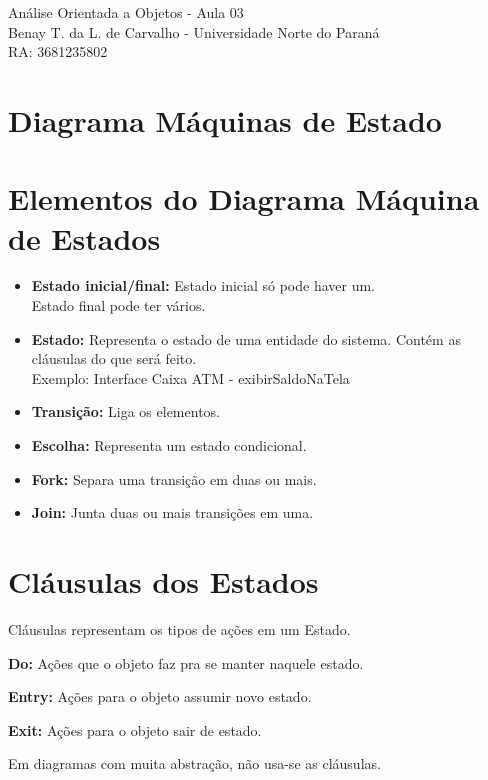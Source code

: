 \documentclass[12pt, a4paper]{article}
\newcommand{\cvsection}[1]{\section*{\rmfamily#1}}
\begin{document}
\selectfont

\begin{center}

    {\LARGE
        Análise Orientada a Objetos - Aula 03\\
    }
    {\Large
        Benay T. da L. de Carvalho - Universidade Norte do Paraná\\
        RA: 3681235802
    }

\end{center}

\vspace{1cm}

\section{Diagrama Máquinas de Estado}

\indent
\cvsection{Elementos do Diagrama Máquina de Estados}

{\Large
\begin{itemize}
    \item \textbf{Estado inicial/final:} Estado inicial só pode haver um.\\
    Estado final pode ter vários.
    \item \textbf{Estado:} Representa o estado de uma entidade do sistema.
    Contém as cláusulas do que será feito. \\Exemplo: Interface Caixa ATM - exibirSaldoNaTela
    \item \textbf{Transição:} Liga os elementos.
    \item \textbf{Escolha:} Representa um estado condicional.
    \item \textbf{Fork:} Separa uma transição em duas ou mais.
    \item \textbf{Join:} Junta duas ou mais transições em uma.
\end{itemize}
}

\indent
\cvsection{Cláusulas dos Estados}

{\Large

\hspace{1em}Cláusulas representam os tipos de ações em um Estado.

\begin{description}
    \item \textbf{Do:} Ações que o objeto faz pra se manter naquele estado.
    \item \textbf{Entry:} Ações para o objeto assumir novo estado.
    \item \textbf{Exit:} Ações para o objeto sair de estado.
\end{description}

\noindent
\hspace{1em}Em diagramas com muita abstração, não usa-se as cláusulas.
}
\end{document}
